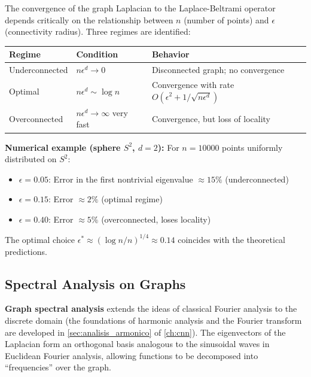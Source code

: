 \begin{remark}\label{rem:tasas_convergencia_laplaciano}
	The convergence of the graph Laplacian to the Laplace-Beltrami operator depends critically on the relationship between $n$ (number of points) and $\epsilon$ (connectivity radius). Three regimes are identified:

	\begin{center}
	\small
	\begin{tabular}{@{}llp{5cm}@{}}
		\toprule
		\textbf{Regime} & \textbf{Condition} & \textbf{Behavior} \\
		\midrule
		Underconnected & $n\epsilon^d \to 0$ & Disconnected graph; no convergence \\
		\addlinespace
		Optimal & $n\epsilon^d \sim \log n$ & Convergence with rate $O(\epsilon^2 + 1/\sqrt{n\epsilon^d})$ \\
		\addlinespace
		Overconnected & $n\epsilon^d \to \infty$ very fast & Convergence, but loss of locality \\
		\bottomrule
	\end{tabular}
	\end{center}

	\textbf{Numerical example (sphere $S^2$, $d=2$):} For $n = 10000$ points uniformly distributed on $S^2$:
	\begin{itemize}
		\item $\epsilon = 0.05$: Error in the first nontrivial eigenvalue $\approx 15\%$ (underconnected)
		\item $\epsilon = 0.15$: Error $\approx 2\%$ (optimal regime)
		\item $\epsilon = 0.40$: Error $\approx 5\%$ (overconnected, loses locality)
	\end{itemize}
	The optimal choice $\epsilon^* \approx (\log n / n)^{1/4} \approx 0.14$ coincides with the theoretical predictions.
\end{remark}

\subsection{Spectral Analysis on Graphs}\label{subsec:analisis_espectral_grafos_gdl}

\textbf{Graph spectral analysis} extends the ideas of classical Fourier analysis to the discrete domain (the foundations of harmonic analysis and the Fourier transform are developed in \autoref{sec:analisis_armonico} of \autoref{ch:cnn}). The eigenvectors of the Laplacian form an orthogonal basis analogous to the sinusoidal waves in Euclidean Fourier analysis, allowing functions to be decomposed into ``frequencies'' over the graph.

